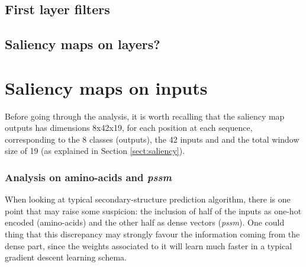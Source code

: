 	\subsection{First layer filters}
	
	\subsection*{Saliency maps on layers?}


\section{Saliency maps on inputs}

Before going through the analysis, it is worth recalling that the saliency map outputs has dimensions 8x42x19, for each position at each sequence, corresponding to the 8 classes (outputs), the 42 inputs and and the total window size of 19 (as explained in Section \ref{sect:saliency}).


\subsubsection*{Analysis on amino-acids and \textit{pssm}}
When looking at typical secondary-structure prediction algorithm, there is one point that may raise some suspicion: the inclusion of half of the inputs as one-hot encoded (amino-acids) and the other half as dense vectors (\textit{pssm}). One could thing that this discrepancy may strongly favour the information coming from the dense part, since the weights associated to it will learn much faster in a typical gradient descent learning schema.

